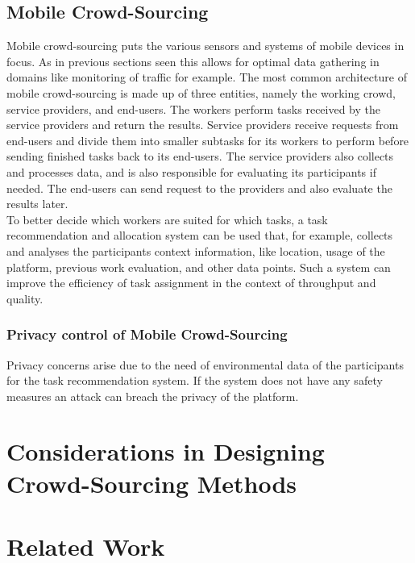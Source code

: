 \documentclass[a4paper,12pt]{report}
\begin{document}
	\section[Mobile Crowd-Sourcing]{Mobile Crowd-Sourcing \cite{MobileCrowdSourcing}}
	\startsection
		Mobile crowd-sourcing puts the various sensors and systems of mobile devices in focus. As in previous sections seen this allows for optimal data gathering in domains like monitoring of traffic for example.
		The most common architecture of mobile crowd-sourcing is made up of three entities, namely the working crowd, service providers, and end-users. The workers perform tasks received by the service providers and return the results. Service providers receive requests from end-users and divide them into smaller subtasks for its workers to perform before sending finished tasks back to its end-users. The service providers also collects and processes data, and is also responsible for evaluating its participants if needed. The end-users can send request to the providers and also evaluate the results later.\\
		To better decide which workers are suited for which tasks, a task recommendation and allocation system can be used that, for example, collects and analyses the participants context information, like location, usage of the platform, previous work evaluation, and other data points. Such a system can improve the efficiency of task assignment in the context of throughput and quality.
		\subsection{Privacy control of Mobile Crowd-Sourcing}
		\startsubsection
			Privacy concerns arise due to the need of environmental data of the participants for the task recommendation system. If the system does not have any safety measures an attack can breach the privacy  of the platform.
			\closesection  
	\closesection


	\chapter{Considerations in Designing Crowd-Sourcing Methods}
	\startsection
	\closesection
	
	\chapter{Related Work \cite{LanierWeylBlueprint}}
	\startsection
	\closesection
	
	\newpage
	\printbibliography
\end{document}
